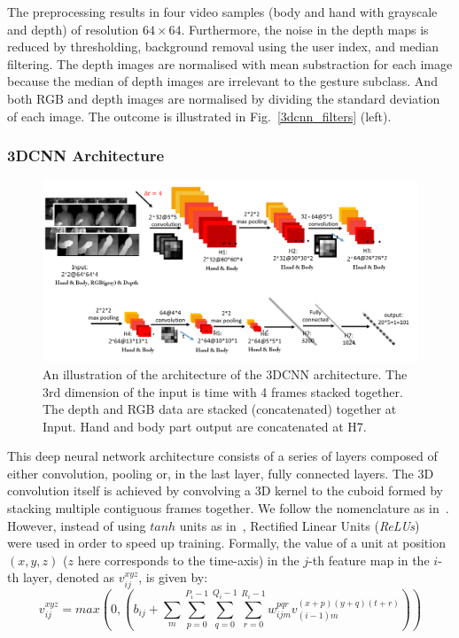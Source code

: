 The preprocessing results in four video samples (body and hand with grayscale and depth) of resolution $64\times64$. Furthermore, the noise in the depth maps is reduced by thresholding, background removal using the user index, and median filtering.
The depth images are normalised with mean substraction for each image because the median of depth images are irrelevant to the gesture subclass. And both RGB and depth images are normalised by dividing the standard deviation of each image.
The outcome is illustrated in Fig.~\ref{3dcnn_filters} (left).


\subsubsection{3DCNN Architecture}
\begin{figure}[t]
  \centering
  \includegraphics[width=.9\textwidth]{images/3DCNN_new}
  \caption{An illustration of the architecture of the 3DCNN architecture. The 3rd dimension of the input is time with 4 frames stacked together. The depth and RGB data are stacked (concatenated) together at Input. Hand and body part output are concatenated at H7.}\label{3dcnn_architecture}
\end{figure}

This deep neural network architecture consists of a series of layers composed of either convolution, pooling or, in the last layer, fully connected layers.
The 3D convolution itself is achieved by convolving a 3D kernel to the cuboid formed by stacking multiple contiguous frames together. We follow the nomenclature as in~\cite{ji20133d}.
 However, instead of using $tanh$ units as in~\cite{ji20133d},  Rectified Linear Units (\emph{ReLUs})~\cite{krizhevsky2012imagenet} were used in order to speed up training.
 Formally, the value of a unit at position $(x, y, z)$ ($z$ here corresponds to the time-axis) in the $j$-th feature map in the $i$-th layer, denoted as $v^{xyz}_{ij}$, is given by:
\begin{equation}
v^{xyz}_{ij} =  max( 0,  ( b_{ij} + \sum_m \sum_{p=0}^{P_i - 1} \sum_{q=0}^{Q_i -1 } \sum_{r=0}^{R_i -1} w^{pqr}_{ijm} v^{(x+p)(y+q)(t+r)}_{(i-1)m} ))
\label{ReLU}
\end{equation}

